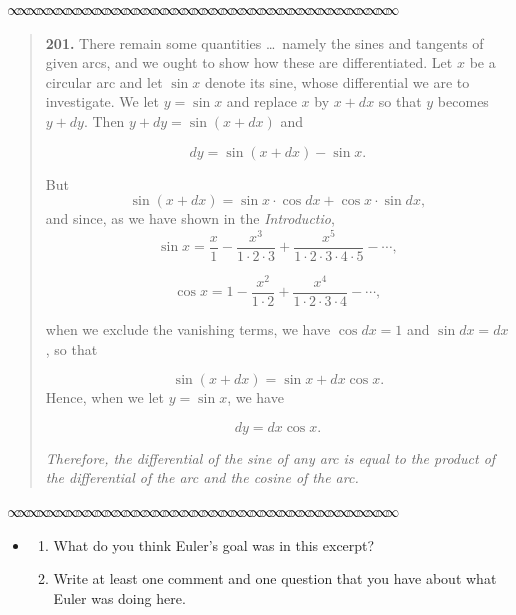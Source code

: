 \documentclass[11pt]{article}
\newcommand{\sep}{\vspace{-3pt}
\begin{center}
{\mathversion{normal}
$\infty \mspace{-5.5mu}\infty \mspace{-5.5mu}\infty \mspace{-5.5mu}\infty \mspace{-5.5mu}
\infty \mspace{-5.5mu}\infty \mspace{-5.5mu}\infty \mspace{-5.5mu}\infty \mspace{-5.5mu}
\infty \mspace{-5.5mu}\infty \mspace{-5.5mu}\infty \mspace{-5.5mu}\infty \mspace{-5.5mu}
\infty \mspace{-5.5mu}\infty \mspace{-5.5mu}\infty \mspace{-5.5mu}\infty \mspace{-5.5mu}
\infty \mspace{-5.5mu}\infty \mspace{-5.5mu}\infty \mspace{-5.5mu}\infty \mspace{-5.5mu}
\infty \mspace{-5.5mu}\infty \mspace{-5.5mu}\infty \mspace{-5.5mu}\infty \mspace{-5.5mu}
\infty \mspace{-5.5mu}\infty \mspace{-5.5mu}\infty \mspace{-5.5mu}\infty \mspace{-5.5mu}
\infty \mspace{-5.5mu}\infty \mspace{-5.5mu}\infty \mspace{-5.5mu}\infty \mspace{-5.5mu}
\infty \mspace{-5.5mu}\infty \mspace{-5.5mu}\infty \mspace{-5.5mu}\infty \mspace{-5.5mu}
\infty \mspace{-5.5mu}\infty \mspace{-5.5mu}\infty \mspace{-5.5mu}\infty \mspace{-5.5mu}$}
\end{center} \vspace*{-5pt}}
\newenvironment{source}%
 {\bigskip \sep \vspace*{-6pt} \begin{quote}
          \begin{sf}   }
   {   \end{sf}     \end{quote} \vspace*{-6pt} \sep \bigskip}%
\newcounter{tasknumb}
\newcommand{\tasknumb}{\stepcounter{tasknumb}\textmd{\textbf{$\fbox{$\fbox{Task \thetasknumb}$}$}}}
\newenvironment{task}%
 {\begin{itemize}
 \item[\tasknumb]  }
{
    \end{itemize}    }%
\begin{document}
\vspace*{-6pt}



\begin{source}

\vspace*{-6pt}

\textbf{201.} There remain some quantities \ldots~namely the sines and tangents of given arcs, and we ought to show how these are differentiated. Let $x$ be a circular arc and let $\sin x$ denote its sine, whose differential we are to investigate.  We let $y= \sin x$ and replace $x$ by $x + dx$ so that $y$ becomes $y + dy$.  Then $y + dy = \sin(x + dx)$ and


\vspace*{-6pt}

$$
dy = \sin(x + dx) - \sin x.
$$

\vspace*{-6pt}

But
\vspace*{-6pt}
$$
\sin(x + dx) = \sin x \cdot \cos dx + \cos x \cdot \sin dx,
$$
and since, as we have shown in the \emph{Introductio},
$$
\sin x = \frac{x}{1} - \frac{x^3}{1 \cdot 2 \cdot 3} + \frac{x^5}{1 \cdot 2 \cdot 3 \cdot 4 \cdot 5} - \cdots ,
$$


\vspace*{-6pt}

$$
\cos x = 1 -  \frac{x^2}{1 \cdot 2} + \frac{x^4}{1 \cdot 2 \cdot 3 \cdot 4} - \cdots ,
$$

when we exclude the vanishing terms, we have $\cos dx = 1$ and $\sin dx = dx$, so that

\vspace*{-6pt}

$$
\sin(x + dx) = \sin x + dx \cos x.
$$
Hence, when we let $y = \sin x$, we have

\vspace*{-6pt}

$$
dy = dx \cos x.
$$

\textit{Therefore, the differential of the sine of any arc is equal to the product of the differential of the arc and the cosine of the arc.}

\vspace*{-6pt}
\end{source}


\begin{task}\begin{enumerate}
\item[(a)] What do you think Euler's goal was in  this excerpt?
\item[(b)] Write at least one comment and one question that you have about what Euler was doing here.
\end{enumerate}
\end{task}
\end{document}
